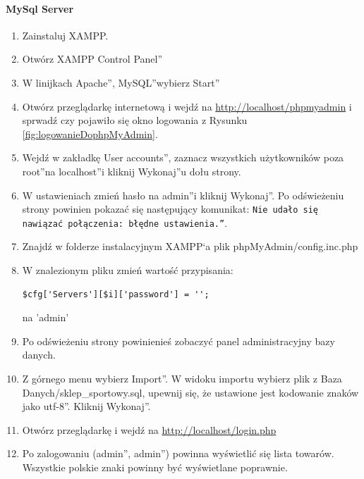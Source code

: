\documentclass[a4paper, 12pt]{article}
\begin{document}
\paragraph{MySql Server}
\begin{enumerate}
	\item Zainstaluj XAMPP.
	\item Otwórz \quotedblbase XAMPP Control Panel\textquotedblright
	\item W linijkach \quotedblbase Apache\textquotedblright , \quotedblbase MySQL\textquotedblright wybierz \quotedblbase Start\textquotedblright
	\item Otwórz przeglądarkę internetową i wejdź na \url{http://localhost/phpmyadmin} i sprwadź czy pojawiło się okno logowania z Rysunku \ref{fig:logowanieDophpMyAdmin}.
	\item Wejdź w zakładkę \quotedblbase User accounts\textquotedblright, zaznacz wszystkich użytkowników poza \quotedblbase root\textquotedblright na \quotedblbase localhost\textquotedblright i kliknij \quotedblbase Wykonaj\textquotedblright u dołu strony.
	\item W ustawieniach zmień hasło na \quotedblbase admin\textquotedblright i kliknij \quotedblbase Wykonaj\textquotedblright.
	Po odświeżeniu strony powinien pokazać się następujący komunikat:
	\texttt{\quotedblbase Nie udało się nawiązać połączenia: błędne ustawienia.\textquotedblright}.
	\item Znajdź w folderze instalacyjnym XAMPP`a plik phpMyAdmin/config.inc.php
	\item W znalezionym pliku zmień wartość przypisania:\\
			\begin{lstlisting}
$cfg['Servers'][$i]['password'] = '';
			\end{lstlisting}
			na 'admin'
		\item Po odświeżeniu strony powinienieś zobaczyć panel administracyjny bazy danych.
		\item Z górnego menu wybierz \quotedblbase Import\textquotedblright. W widoku importu wybierz plik z Baza Danych/sklep{\_}sportowy.sql, upewnij się, że ustawione jest kodowanie znaków jako \quotedblbase utf-8\textquotedblright. Kliknij \quotedblbase Wykonaj\textquotedblright.
		\item Otwórz przeglądarkę i wejdź na \url{http://localhost/login.php}
		\item Po zalogowaniu (\quotedblbase admin\textquotedblright, \quotedblbase admin\textquotedblright) powinna wyświetlić się lista towarów. Wszystkie polskie znaki powinny być wyświetlane poprawnie.
\end{enumerate}
\end{document}
